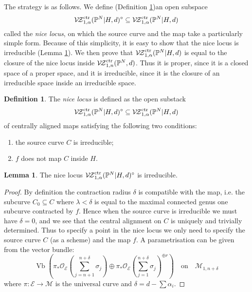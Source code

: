 \documentclass[11pt]{amsart}
\newcommand{\PP}{\mathbb P}
\newcommand{\VZc}{{\mathcal{V\!Z}}^{\rm{ctr}}_{1,n}}
\newcommand{\VZcrel}{{\mathcal{V\!Z}}^{\rm{ctr}}_{1,\alpha}}
\newcommand{\OO}{\mathcal{O}}
\renewcommand{\to}{\rightarrow}
\theoremstyle{definition}
\newtheorem{lem}[thm]{Lemma}
\theoremstyle{definition}
\newtheorem{definition}[thm]{Definition}
\begin{document}
The strategy is as follows. We define (Definition \ref{Definition of nice locus})an open subspace
\begin{equation*}\VZcrel(\PP^N|H,d)^{\circ} \subseteq \VZcrel(\PP^N|H,d)\end{equation*}
called the \emph{nice locus}, on which the source curve and the map take a particularly simple form. Because of this simplicity, it is easy to show that the nice locus is irreducible (Lemma \ref{Nice locus is irreducible}). We then prove that $\VZcrel(\PP^N|H,d)$ is equal to the closure of the nice locus inside $\VZc(\PP^N,d)$. Thus it is proper, since it is a closed space of a proper space, and it is irreducible, since it is the closure of an irreducible space inside an irreducible space.

\begin{definition} \label{Definition of nice locus} The \emph{nice locus} is defined as the open substack
\begin{equation*}\VZcrel(\PP^N|H,d)^{\circ} \subseteq \VZcrel(\PP^N|H,d)\end{equation*}
of centrally aligned maps satisfying the following two conditions:
\begin{enumerate}
\item the source curve $C$ is irreducible;
\item $f$ does not map $C$ inside $H$.
\end{enumerate}
\end{definition}

\begin{lem}\label{Nice locus is irreducible}
The nice locus $\VZcrel(\PP^N|H,d)^{\circ}$ is irreducible.
\end{lem}
\begin{proof}
By definition the contraction radius $\delta$ is compatible with the map, i.e. the subcurve $C_0\subseteq C$ where $\lambda<\delta$ is equal to the maximal connected genus one subcurve contracted by $f$. Hence when the source curve is irreducible we must have $\delta=0$, and we see that the central alignment on $C$ is uniquely and trivially determined. Thus to specify a point in the nice locus we only need to specify the source curve $C$ (as a scheme) and the map $f$. A parametrisation can be given from the vector bundle:
\[ \operatorname{Vb}\left(\pi_*\OO_{\mathcal E}(\sum_{j=n+1}^{n+\delta}\sigma_j)\oplus\pi_*\OO_{\mathcal E}(\sum_{j=1}^{n+\delta}\sigma_j)^{\oplus r}\right) \quad \text{on} \quad \mathcal{M}_{1,n+\delta}\]
where $\pi\colon\mathcal E\to\mathcal M$ is the universal curve and $\delta=d-\sum\alpha_i$.
\end{proof}
\end{document}
